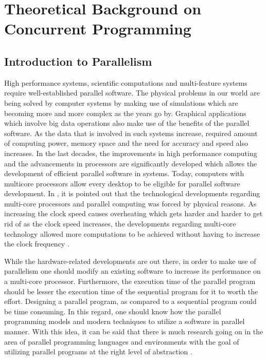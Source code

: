 \chapter{Theoretical Background on Concurrent Programming} \label{multicorechapter} 
\section{Introduction to Parallelism} %
High performance systems, scientific computations and multi-feature systems require well-established parallel software. The physical problems in our world are being solved by computer systems by making use of simulations which are becoming more and more complex as the years go by. Graphical applications which involve big data operations also make use of the benefits of the parallel software. As the data that is involved in such systems increase, required amount of computing power, memory space and the need for accuracy and speed also increases. In the last decades, the improvements in high performance computing and the advancements in processors are significantly developed which allows the development of efficient parallel software in systems. Today, computers with multicore processors allow every desktop to be eligible for parallel software development. In \cite{springerparallel}, it is pointed out that the technological developments regarding multi-core processors and parallel computing was forced by physical reasons. As increasing the clock speed causes overheating which gets harder and harder to get rid of as the clock speed increases, the developments regarding multi-core technology allowed more computations to be achieved without having to increase the clock frequency \cite{springerparallel}.

While the hardware-related developments are out there, in order to make use of parallelism one should modify an existing software to increase its performance on a multi-core processor. Furthermore, the execution time of the parallel program should be lesser the execution time of the sequential program for it to worth the effort. Designing a parallel program, as compared to a sequential program could be time consuming. In this regard, one should know how the parallel programming models and modern techniques to utilize a software in parallel manner. With this idea, it can be said that there is much research going on in the area of parallel programming languages and environments with the goal of utilizing parallel programs at the right level of abstraction \cite{springerparallel}.

